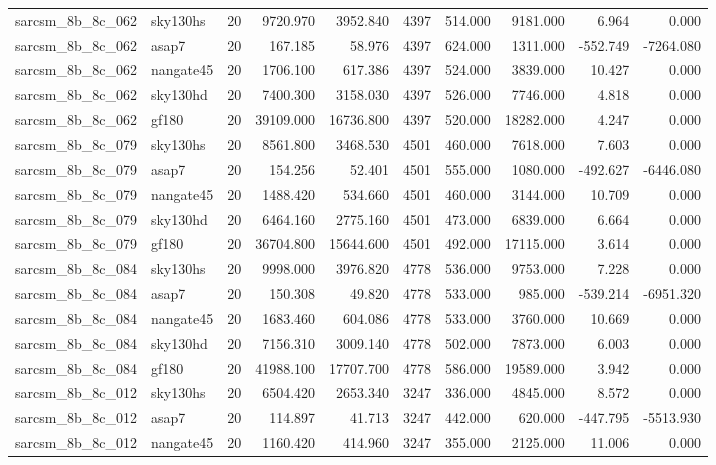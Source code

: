 \begin{longtable}{llrrrrrrrr}
sarcsm\_8b\_8c\_062 & sky130hs & 20 & 9720.970 & 3952.840 & 4397 & 514.000 & 9181.000 & 6.964 & 0.000 \\
sarcsm\_8b\_8c\_062 & asap7 & 20 & 167.185 & 58.976 & 4397 & 624.000 & 1311.000 & -552.749 & -7264.080 \\
sarcsm\_8b\_8c\_062 & nangate45 & 20 & 1706.100 & 617.386 & 4397 & 524.000 & 3839.000 & 10.427 & 0.000 \\
sarcsm\_8b\_8c\_062 & sky130hd & 20 & 7400.300 & 3158.030 & 4397 & 526.000 & 7746.000 & 4.818 & 0.000 \\
sarcsm\_8b\_8c\_062 & gf180 & 20 & 39109.000 & 16736.800 & 4397 & 520.000 & 18282.000 & 4.247 & 0.000 \\
sarcsm\_8b\_8c\_079 & sky130hs & 20 & 8561.800 & 3468.530 & 4501 & 460.000 & 7618.000 & 7.603 & 0.000 \\
sarcsm\_8b\_8c\_079 & asap7 & 20 & 154.256 & 52.401 & 4501 & 555.000 & 1080.000 & -492.627 & -6446.080 \\
sarcsm\_8b\_8c\_079 & nangate45 & 20 & 1488.420 & 534.660 & 4501 & 460.000 & 3144.000 & 10.709 & 0.000 \\
sarcsm\_8b\_8c\_079 & sky130hd & 20 & 6464.160 & 2775.160 & 4501 & 473.000 & 6839.000 & 6.664 & 0.000 \\
sarcsm\_8b\_8c\_079 & gf180 & 20 & 36704.800 & 15644.600 & 4501 & 492.000 & 17115.000 & 3.614 & 0.000 \\
sarcsm\_8b\_8c\_084 & sky130hs & 20 & 9998.000 & 3976.820 & 4778 & 536.000 & 9753.000 & 7.228 & 0.000 \\
sarcsm\_8b\_8c\_084 & asap7 & 20 & 150.308 & 49.820 & 4778 & 533.000 & 985.000 & -539.214 & -6951.320 \\
sarcsm\_8b\_8c\_084 & nangate45 & 20 & 1683.460 & 604.086 & 4778 & 533.000 & 3760.000 & 10.669 & 0.000 \\
sarcsm\_8b\_8c\_084 & sky130hd & 20 & 7156.310 & 3009.140 & 4778 & 502.000 & 7873.000 & 6.003 & 0.000 \\
sarcsm\_8b\_8c\_084 & gf180 & 20 & 41988.100 & 17707.700 & 4778 & 586.000 & 19589.000 & 3.942 & 0.000 \\
sarcsm\_8b\_8c\_012 & sky130hs & 20 & 6504.420 & 2653.340 & 3247 & 336.000 & 4845.000 & 8.572 & 0.000 \\
sarcsm\_8b\_8c\_012 & asap7 & 20 & 114.897 & 41.713 & 3247 & 442.000 & 620.000 & -447.795 & -5513.930 \\
sarcsm\_8b\_8c\_012 & nangate45 & 20 & 1160.420 & 414.960 & 3247 & 355.000 & 2125.000 & 11.006 & 0.000 \\

\end{longtable}
